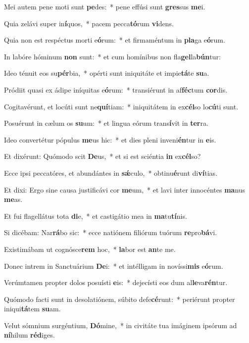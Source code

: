 \item Mei autem pene moti sunt \textbf{pe}des:~* pene effúsi sunt \textbf{gres}sus \textbf{me}i.
\item Quia zelávi super in\textbf{í}quos,~* pacem pecca\textbf{tó}rum \textbf{vi}dens.
\item Quia non est respéctus morti e\textbf{ó}rum:~* et firmaméntum in \textbf{pla}ga e\textbf{ó}rum.
\item In labóre hóminum \textbf{non} sunt:~* et cum homínibus non fla\textbf{gel}la\textbf{bún}tur:
\item Ideo ténuit eos su\textbf{pér}bia,~* opérti sunt iniquitáte et impie\textbf{tá}te \textbf{su}a.
\item Pródiit quasi ex ádipe iníquitas e\textbf{ó}rum:~* transiérunt in af\textbf{féc}tum \textbf{cor}dis.
\item Cogitavérunt, et locúti sunt ne\textbf{quí}tiam:~* iniquitátem in ex\textbf{cél}so lo\textbf{cú}ti sunt.
\item Posuérunt in cælum os \textbf{su}um:~* et lingua eórum trans\textbf{í}vit in \textbf{ter}ra.
\item Ideo convertétur pópulus \textbf{me}us hic:~* et dies pleni inveni\textbf{én}tur in \textbf{e}is.
\item Et dixérunt: Quómodo scit \textbf{De}us,~* et si est sciéntia \textbf{in} ex\textbf{cél}so?
\item Ecce ipsi peccatóres, et abundántes in \textbf{sǽ}culo,~* obtinu\textbf{é}runt di\textbf{ví}tias.
\item Et dixi: Ergo sine causa justificávi cor \textbf{me}um,~* et lavi inter innocéntes \textbf{ma}nus \textbf{me}as.
\item Et fui flagellátus tota \textbf{di}e,~* et castigátio mea in \textbf{ma}tu\textbf{tí}nis.
\item Si dicébam: Nar\textbf{rá}bo sic:~* ecce natiónem filiórum tuórum \textbf{re}pro\textbf{bá}vi.
\item Existimábam ut cognósce\textbf{rem} hoc,~* \textbf{la}bor est \textbf{an}te me.
\item Donec intrem in Sanctuárium \textbf{De}i:~* et intélligam in novíssi\textbf{mis} e\textbf{ó}rum.
\item Verúmtamen propter dolos posuísti \textbf{e}is:~* dejecísti eos dum al\textbf{le}va\textbf{rén}tur.
\item Quómodo facti sunt in desolatiónem, súbito defe\textbf{cé}runt:~* periérunt propter iniqui\textbf{tá}tem \textbf{su}am.
\item Velut sómnium surgéntium, \textbf{Dó}mine,~* in civitáte tua imáginem ipsórum ad \textbf{ní}hilum \textbf{réd}iges.
